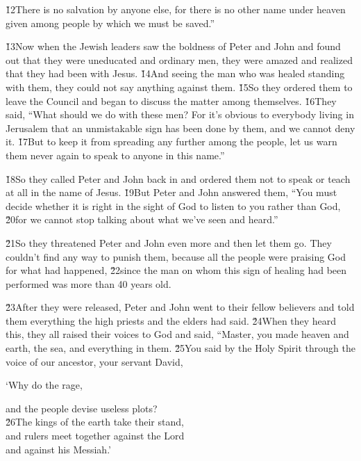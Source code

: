 \v{12}There is no salvation by anyone else, for there is no other name under heaven given among people by which we must be saved.''

\v{13}Now when the Jewish leaders saw the boldness of Peter and John and found out that they were uneducated and ordinary men, they were amazed and realized that they had been with Jesus. \v{14}And seeing the man who was healed standing with them, they could not say anything against them. \v{15}So they ordered them to leave the Council and began to discuss the matter among themselves. \v{16}They said, ``What should we do with these men? For it's obvious to everybody living in Jerusalem that an unmistakable sign has been done by them, and we cannot deny it. \v{17}But to keep it from spreading any further among the people, let us warn them never again to speak to anyone in this name.''

\v{18}So they called Peter and John back in and ordered them not to speak or teach at all in the name of Jesus. \v{19}But Peter and John answered them, ``You must decide whether it is right in the sight of God to listen to you rather than God, \v{20}for we cannot stop talking about what we've seen and heard.''

\v{21}So they threatened Peter and John even more and then let them go. They couldn't find any way to punish them, because all the people were praising God for what had happened, \v{22}since the man on whom this sign of healing had been performed was more than 40 years old.

\v{23}After they were released, Peter and John went to their fellow believers and told them everything the high priests and the elders had said. \v{24}When they heard this, they all raised their voices to God and said, ``Master, you made heaven and earth, the sea, and everything in them. \v{25}You said by the Holy Spirit through the voice of our ancestor, your servant David,

`Why do the  rage,

\begin{poetry}
\poemll    and the people devise useless plots? \\
\poeml \v{26}The kings of the earth take their stand, \\
\poemll    and rulers meet together against the Lord \\
\poemlll       and against his Messiah.'
\end{poetry}

